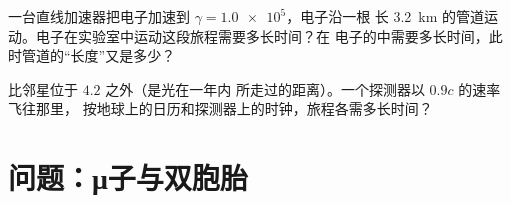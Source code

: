 \begin{exercise}[$\star\star\star$]\label{exo:g12:special-relativity:14}
一台直线加速器把电子加速到 $\gamma = \num{1.0e5}$，电子沿一根
长 \qty{3.2}{km} 的管道运动。电子在实验室中运动这段旅程需要多长时间？在
电子的中需要多长时间，此时管道的“长度”又是多少？
\end{exercise}

\begin{exercise}[$\star\star\star$]\label{exo:g12:special-relativity:15}
比邻星位于 $4.2$ 之外（是光在一年内
所走过的距离）。一个探测器以 $0.9c$ 的速率飞往那里，
按地球上的日历和探测器上的时钟，旅程各需多长时间？
\end{exercise}

\section{问题：μ子与双胞胎}


